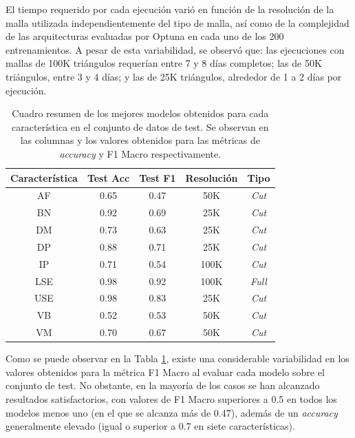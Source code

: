 El tiempo requerido por cada ejecución varió en función de la resolución de la malla utilizada independientemente del tipo de malla, así como de la complejidad de las arquitecturas evaluadas por Optuna en cada uno de los 200 entrenamientos. A pesar de esta variabilidad, se observó que: las ejecuciones con mallas de 100K triángulos requerían entre 7 y 8 días completos; las de 50K triángulos, entre 3 y 4 días; y las de 25K triángulos, alrededor de 1 a 2 días por ejecución.

\begin{table}[h]
    \centering
    \begin{tabular}{|c|c|c|c|c|}
    \hline
    \rowcolor[HTML]{D33333} 
    {\color[HTML]{FFFFFF} \textbf{Característica}} & {\color[HTML]{FFFFFF} \textbf{Test Acc}} & {\color[HTML]{FFFFFF} \textbf{Test F1}} & {\color[HTML]{FFFFFF} \textbf{Resolución}} & {\color[HTML]{FFFFFF} \textbf{Tipo}} \\ \hline
    AF & 0.65 & 0.47 & 50K & \textit{Cut} \\
    BN & 0.92 & 0.69 & 25K & \textit{Cut} \\
    DM & 0.73 & 0.63 & 25K & \textit{Cut} \\
    DP & 0.88 & 0.71 & 25K & \textit{Cut} \\
    IP & 0.71 & 0.54 & 100K & \textit{Cut} \\
    LSE & 0.98 & 0.92 & 100K & \textit{Full} \\
    USE & 0.98 & 0.83 & 25K & \textit{Cut} \\
    VB & 0.52 & 0.53 & 50K & \textit{Cut} \\
    VM & 0.70 & 0.67 & 50K & \textit{Cut} \\ \hline
    \end{tabular}
    \caption[Cuadro resumen de los mejores modelos obtenidos para cada característica]{Cuadro resumen de los mejores modelos obtenidos para cada característica en el conjunto de datos de test. Se observan en las columnas  y  los valores obtenidos para las métricas de \textit{accuracy} y F1 Macro respectivamente.}
    \label{table5:single_tag__results}
\end{table}

Como se puede observar en la Tabla \ref{table5:single_tag__results}, existe una considerable variabilidad en los valores obtenidos para la métrica F1 Macro al evaluar cada modelo sobre el conjunto de test. No obstante, en la mayoría de los casos se han alcanzado resultados satisfactorios, con valores de F1 Macro superiores a 0.5 en todos los modelos menos uno (en el que se alcanza más de 0.47), además de un \textit{accuracy} generalmente elevado (igual o superior a 0.7 en siete características).


